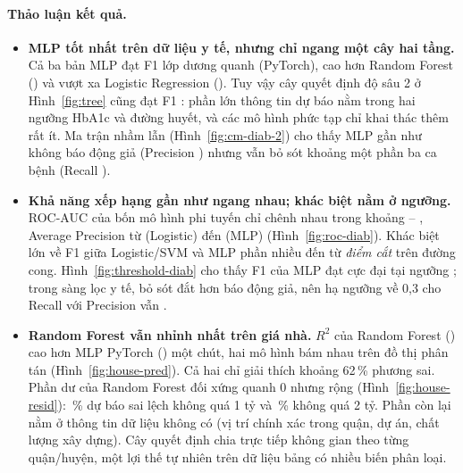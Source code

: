 \paragraph{Thảo luận kết quả.}
\begin{itemize}
  \item \textbf{MLP tốt nhất trên dữ liệu y tế, nhưng chỉ ngang một cây hai tầng.} Cả ba bản MLP đạt F1 lớp dương quanh
     (PyTorch), cao hơn Random Forest () và vượt xa Logistic
    Regression (). Tuy vậy cây quyết định độ sâu 2 ở Hình~\ref{fig:tree} cũng đạt F1
    : phần lớn thông tin dự báo nằm trong hai ngưỡng HbA1c và đường huyết, và các mô hình phức tạp
    chỉ khai thác thêm rất ít. Ma trận nhầm lẫn (Hình~\ref{fig:cm-diab-2}) cho thấy MLP gần như không báo động giả (Precision
    ) nhưng vẫn bỏ sót khoảng một phần ba ca bệnh (Recall
    ).
  \item \textbf{Khả năng xếp hạng gần như ngang nhau; khác biệt nằm ở ngưỡng.} ROC-AUC của bốn mô hình phi tuyến chỉ chênh
    nhau trong khoảng  -- , Average Precision từ
     (Logistic) đến  (MLP) (Hình~\ref{fig:roc-diab}). Khác biệt lớn về
    F1 giữa Logistic/SVM và MLP phần nhiều đến từ \emph{điểm cắt} trên đường cong. Hình~\ref{fig:threshold-diab} cho thấy F1 của
    MLP đạt cực đại  tại ngưỡng ; trong sàng lọc y tế, bỏ sót đắt hơn báo
    động giả, nên hạ ngưỡng về 0,3 cho Recall  với Precision vẫn .
  \item \textbf{Random Forest vẫn nhỉnh nhất trên giá nhà.} $R^2$ của Random Forest () cao hơn
    MLP PyTorch () một chút, hai mô hình bám nhau trên đồ thị phân tán (Hình~\ref{fig:house-pred}).
    Cả hai chỉ giải thích khoảng 62\,\% phương sai. Phần dư của Random Forest đối xứng quanh 0 nhưng rộng
    (Hình~\ref{fig:house-resid}): \,\% dự báo sai lệch không quá 1 tỷ và
    \,\% không quá 2 tỷ. Phần còn lại nằm ở thông tin dữ liệu không có (vị trí chính xác
    trong quận, dự án, chất lượng xây dựng). Cây quyết định chia trực tiếp không gian theo từng quận/huyện, một lợi thế tự
    nhiên trên dữ liệu bảng có nhiều biến phân loại.

\end{itemize}
